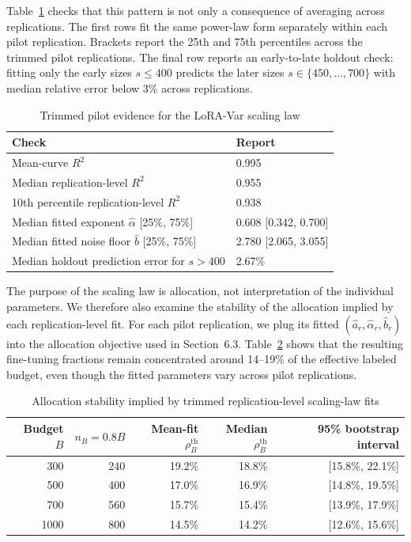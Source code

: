 \documentclass[11pt]{article}
\begin{document}
Table~\ref{tab:scaling_law_trimmed_evidence} checks that this pattern is not only a consequence
of averaging across replications. The first rows fit the same power-law form separately within
each pilot replication. Brackets report the 25th and 75th percentiles across the trimmed pilot
replications. The final row reports an early-to-late holdout check: fitting only the early sizes
$s\le 400$ predicts the later sizes $s\in\{450,\ldots,700\}$ with median relative error below
3\% across replications.

\begin{table}[H]
\centering
\caption{Trimmed pilot evidence for the LoRA-Var scaling law}
\label{tab:scaling_law_trimmed_evidence}
\small
\setlength{\tabcolsep}{8pt}
\begin{tabular}{@{}ll@{}}
\toprule
Check & Report \\
\midrule
Mean-curve $R^2$ & 0.995 \\
Median replication-level $R^2$ & 0.955 \\
10th percentile replication-level $R^2$ & 0.938 \\
Median fitted exponent $\hat\alpha$ [25\%, 75\%] & 0.608 [0.342, 0.700] \\
Median fitted noise floor $\hat b$ [25\%, 75\%] & 2.780 [2.065, 3.055] \\
Median holdout prediction error for $s>400$ & 2.67\% \\
\bottomrule
\end{tabular}
\end{table}

The purpose of the scaling law is allocation, not interpretation of the individual parameters.
We therefore also examine the stability of the allocation implied by each replication-level fit.
For each pilot replication, we plug its fitted $(\hat a_r,\hat\alpha_r,\hat b_r)$ into the
allocation objective used in Section~6.3. Table~\ref{tab:scaling_law_allocation_stability} shows
that the resulting fine-tuning fractions remain concentrated around 14--19\% of the effective
labeled budget, even though the fitted parameters vary across pilot replications.

\begin{table}[H]
\centering
\caption{Allocation stability implied by trimmed replication-level scaling-law fits}
\label{tab:scaling_law_allocation_stability}
\small
\setlength{\tabcolsep}{9pt}
\begin{tabular}{@{}rrrrr@{}}
\toprule
Budget $B$ & $n_B=0.8B$ & Mean-fit $\rho_B^{\mathrm{th}}$ & Median $\rho_B^{\mathrm{th}}$ & 95\% bootstrap interval \\
\midrule
300  & 240 & 19.2\% & 18.8\% & [15.8\%, 22.1\%] \\
500  & 400 & 17.0\% & 16.9\% & [14.8\%, 19.5\%] \\
700  & 560 & 15.7\% & 15.4\% & [13.9\%, 17.9\%] \\
1000 & 800 & 14.5\% & 14.2\% & [12.6\%, 15.6\%] \\
\bottomrule
\end{tabular}
\end{table}
\end{document}
